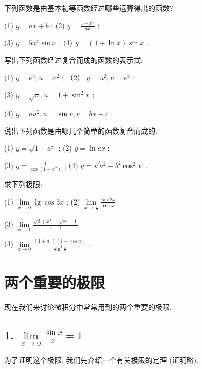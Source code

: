 \documentclass[lang=cn,newtx,10pt,scheme=chinese]{elegantbook}
\begin{document}
\begin{problemset}[练习]

\item 下列函数是由基本初等函数经过哪些运算得出的函数?

(1) \(y = {ax} + b\) ; (2) \(y = \frac{1 + {x}^{2}}{ax}\) ;

(3) \(y = 5{a}^{x}\sin x\) ; (4) \(y = \left( {1 + \ln x}\right) \sin x\) .

\item 写出下列函数经过复合而成的函数的表示式:

(1) \(y = {e}^{u},u = {x}^{2}\) ; （2） \(y = {u}^{2},u = {e}^{x}\) ;

(3) \(y = \sqrt{u},u = 1 + {\sin }^{2}x\) ;

(4) \(y = a{u}^{2},u = \sin v,v = {bx} + c\) .

\item 说出下列函数是由哪几个简单的函数复合而成的:

(1) \(y = \sqrt{1 + {a}^{x}}\) ; (2) \(y = \ln {ax}\) ;

(3) \(y = \frac{1}{\cos \left( {1 + {x}^{2}}\right) }\) ; (4) \(y = \sqrt{{a}^{2} - {b}^{2}{\cos }^{2}x}\) .

\item 求下列极限:

(1) \(\mathop{\lim }\limits_{{x \rightarrow 0}}\lg \cos {3x}\) ; (2) \(\mathop{\lim }\limits_{{x \rightarrow \frac{\pi }{2}}}\frac{\sin {2x}}{\cos x}\)

(3) \(\mathop{\lim }\limits_{{x \rightarrow 1}}\frac{\sqrt{3 + {x}^{2}} - \sqrt{{x}^{2} - 1}}{x + 1}\)

(4) \(\mathop{\lim }\limits_{{x \rightarrow 0}}\frac{\left( {1 + {a}^{x}}\right) \left( {1 - \cos x}\right) }{{\sin }^{2}\frac{x}{2}}\) .

\end{problemset}
\section{两个重要的极限}

现在我们来讨论微积分中常常用到的两个重要的极限.

\subsection*{1. \(\mathop{\lim }\limits_{{x \rightarrow 0}}\frac{\sin x}{x} = 1\)}

为了证明这个极限, 我们先介绍一个有关极限的定理 (证明略).
\end{document}
